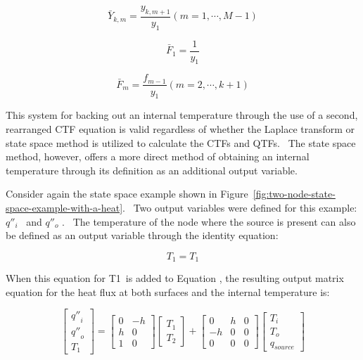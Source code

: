 \begin{equation}
{\bar Y_{k,m}} = \frac{{{y_{k,m + 1}}}}{{{y_1}}}\left( {m = 1, \cdots ,M - 1} \right)
\end{equation}

\begin{equation}
{\bar F_1} = \frac{1}{{{y_1}}}
\end{equation}

\begin{equation}
{\bar F_m} = \frac{{{f_{m - 1}}}}{{{y_1}}}\left( {m = 2, \cdots ,k + 1} \right)
\end{equation}

This system for backing out an internal temperature through the use of a second, rearranged CTF equation is valid regardless of whether the Laplace transform or state space method is utilized to calculate the CTFs and QTFs.~ The state space method, however, offers a more direct method of obtaining an internal temperature through its definition as an additional output variable.

Consider again the state space example shown in Figure~\ref{fig:two-node-state-space-example-with-a-heat}.~ Two output variables were defined for this example: \({q''_i}\) ~and \({q''_o}\) .~ The temperature of the node where the source is present can also be defined as an output variable through the identity equation:

\begin{equation}
{T_1} = {T_1}
\end{equation}

When this equation for T1~is added to Equation , the resulting output matrix equation for the heat flux at both surfaces and the internal temperature is:

\begin{equation}
\left[ {\begin{array}{*{20}{c}}{{{q''}_i}}\\ {{{q''}_o}}\\ {{T_1}}\end{array}} \right] = \left[ {\begin{array}{*{20}{c}}0&{ - h}\\h&0\\1&0\end{array}} \right]\left[ {\begin{array}{*{20}{c}}{{T_1}}\\ {{T_2}}\end{array}} \right] + \left[ {\begin{array}{*{20}{c}}0&h&0\\ { - h}&0&0\\0&0&0\end{array}} \right]\left[ {\begin{array}{*{20}{c}}{{T_i}}\\ {{T_o}}\\ {{q_{source}}}\end{array}} \right]
\end{equation}

